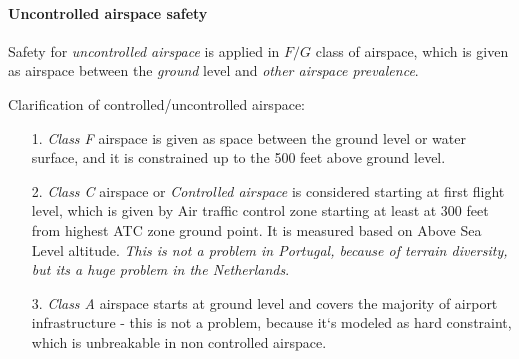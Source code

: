 \paragraph{Uncontrolled airspace safety} Safety for \emph{uncontrolled airspace} is applied in $F/G$ class of airspace, which is given as airspace between the \emph{ground} level and \emph{other airspace prevalence}.
\begin{note}{Clarification of controlled/uncontrolled airspace:}
    \begin{itemize}
        \item[1.] \emph{Class F} airspace is given as space between the ground level or water surface, and it is constrained up to the 500 feet above ground level.
        \item[2.] \emph{Class C} airspace or \emph{Controlled airspace} is considered starting at first flight level, which is given by Air traffic control zone starting at least at 300 feet from highest ATC zone ground point. It is measured based on Above Sea Level altitude. \emph{This is not a problem in Portugal, because of terrain diversity, but its a huge problem in the Netherlands}.
        \item[3.] \emph{Class A} airspace starts at ground level and covers the majority of airport infrastructure - this is not a problem, because it`s modeled as hard constraint, which is unbreakable in non controlled airspace.
    \end{itemize}
\end{note}

